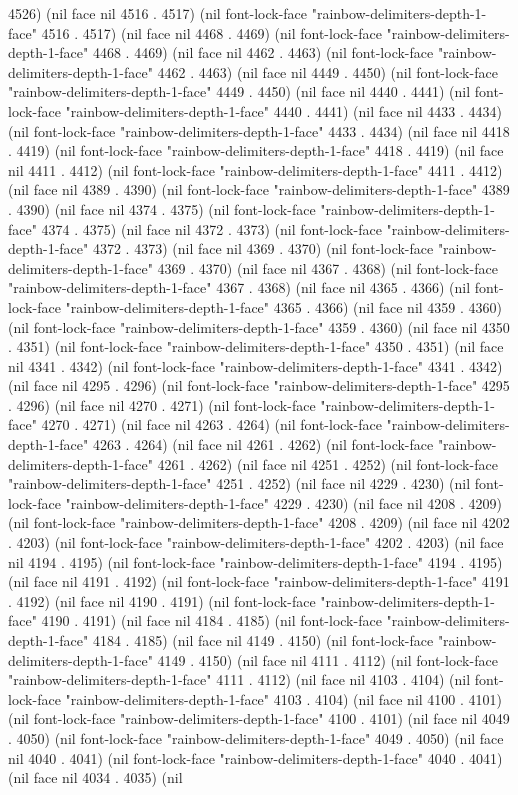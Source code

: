 4526) (nil face nil 4516 . 4517) (nil font-lock-face "rainbow-delimiters-depth-1-face" 4516 . 4517) (nil face nil 4468 . 4469) (nil font-lock-face "rainbow-delimiters-depth-1-face" 4468 . 4469) (nil face nil 4462 . 4463) (nil font-lock-face "rainbow-delimiters-depth-1-face" 4462 . 4463) (nil face nil 4449 . 4450) (nil font-lock-face "rainbow-delimiters-depth-1-face" 4449 . 4450) (nil face nil 4440 . 4441) (nil font-lock-face "rainbow-delimiters-depth-1-face" 4440 . 4441) (nil face nil 4433 . 4434) (nil font-lock-face "rainbow-delimiters-depth-1-face" 4433 . 4434) (nil face nil 4418 . 4419) (nil font-lock-face "rainbow-delimiters-depth-1-face" 4418 . 4419) (nil face nil 4411 . 4412) (nil font-lock-face "rainbow-delimiters-depth-1-face" 4411 . 4412) (nil face nil 4389 . 4390) (nil font-lock-face "rainbow-delimiters-depth-1-face" 4389 . 4390) (nil face nil 4374 . 4375) (nil font-lock-face "rainbow-delimiters-depth-1-face" 4374 . 4375) (nil face nil 4372 . 4373) (nil font-lock-face "rainbow-delimiters-depth-1-face" 4372 . 4373) (nil face nil 4369 . 4370) (nil font-lock-face "rainbow-delimiters-depth-1-face" 4369 . 4370) (nil face nil 4367 . 4368) (nil font-lock-face "rainbow-delimiters-depth-1-face" 4367 . 4368) (nil face nil 4365 . 4366) (nil font-lock-face "rainbow-delimiters-depth-1-face" 4365 . 4366) (nil face nil 4359 . 4360) (nil font-lock-face "rainbow-delimiters-depth-1-face" 4359 . 4360) (nil face nil 4350 . 4351) (nil font-lock-face "rainbow-delimiters-depth-1-face" 4350 . 4351) (nil face nil 4341 . 4342) (nil font-lock-face "rainbow-delimiters-depth-1-face" 4341 . 4342) (nil face nil 4295 . 4296) (nil font-lock-face "rainbow-delimiters-depth-1-face" 4295 . 4296) (nil face nil 4270 . 4271) (nil font-lock-face "rainbow-delimiters-depth-1-face" 4270 . 4271) (nil face nil 4263 . 4264) (nil font-lock-face "rainbow-delimiters-depth-1-face" 4263 . 4264) (nil face nil 4261 . 4262) (nil font-lock-face "rainbow-delimiters-depth-1-face" 4261 . 4262) (nil face nil 4251 . 4252) (nil font-lock-face "rainbow-delimiters-depth-1-face" 4251 . 4252) (nil face nil 4229 . 4230) (nil font-lock-face "rainbow-delimiters-depth-1-face" 4229 . 4230) (nil face nil 4208 . 4209) (nil font-lock-face "rainbow-delimiters-depth-1-face" 4208 . 4209) (nil face nil 4202 . 4203) (nil font-lock-face "rainbow-delimiters-depth-1-face" 4202 . 4203) (nil face nil 4194 . 4195) (nil font-lock-face "rainbow-delimiters-depth-1-face" 4194 . 4195) (nil face nil 4191 . 4192) (nil font-lock-face "rainbow-delimiters-depth-1-face" 4191 . 4192) (nil face nil 4190 . 4191) (nil font-lock-face "rainbow-delimiters-depth-1-face" 4190 . 4191) (nil face nil 4184 . 4185) (nil font-lock-face "rainbow-delimiters-depth-1-face" 4184 . 4185) (nil face nil 4149 . 4150) (nil font-lock-face "rainbow-delimiters-depth-1-face" 4149 . 4150) (nil face nil 4111 . 4112) (nil font-lock-face "rainbow-delimiters-depth-1-face" 4111 . 4112) (nil face nil 4103 . 4104) (nil font-lock-face "rainbow-delimiters-depth-1-face" 4103 . 4104) (nil face nil 4100 . 4101) (nil font-lock-face "rainbow-delimiters-depth-1-face" 4100 . 4101) (nil face nil 4049 . 4050) (nil font-lock-face "rainbow-delimiters-depth-1-face" 4049 . 4050) (nil face nil 4040 . 4041) (nil font-lock-face "rainbow-delimiters-depth-1-face" 4040 . 4041) (nil face nil 4034 . 4035) (nil 